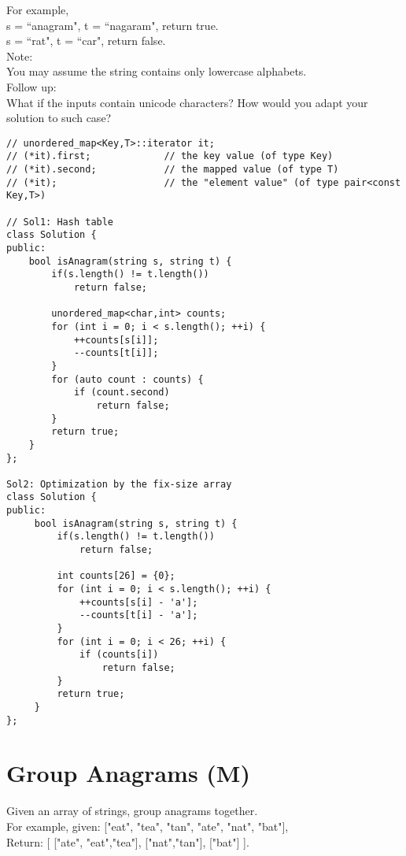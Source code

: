 For example,\\
s = ``anagram", t = ``nagaram", return true.\\
s = ``rat", t = ``car", return false.\\

Note:\\
You may assume the string contains only lowercase alphabets.\\

Follow up:\\
What if the inputs contain unicode characters? How would you adapt your solution to such case?\\

\begin{lstlisting}
// unordered_map<Key,T>::iterator it;
// (*it).first;             // the key value (of type Key)
// (*it).second;            // the mapped value (of type T)
// (*it);                   // the "element value" (of type pair<const Key,T>)

// Sol1: Hash table
class Solution {
public:
    bool isAnagram(string s, string t) {
        if(s.length() != t.length())
            return false;
            
        unordered_map<char,int> counts;
        for (int i = 0; i < s.length(); ++i) {
            ++counts[s[i]];
            --counts[t[i]];
        }
        for (auto count : counts) {
            if (count.second)
                return false;
        }
        return true;
    }
};

Sol2: Optimization by the fix-size array
class Solution {
public:
     bool isAnagram(string s, string t) {
         if(s.length() != t.length())
             return false;
            
         int counts[26] = {0};
         for (int i = 0; i < s.length(); ++i) {
             ++counts[s[i] - 'a'];
             --counts[t[i] - 'a'];
         }
         for (int i = 0; i < 26; ++i) {
             if (counts[i])
                 return false;
         }
         return true;
     }
};
\end{lstlisting}


\section{Group Anagrams (M)}
Given an array of strings, group anagrams together.\\

For example, given: ["eat", "tea", "tan", "ate", "nat", "bat"],\\
Return:
[
  ["ate", "eat","tea"],
  ["nat","tan"],
  ["bat"]
].\\

